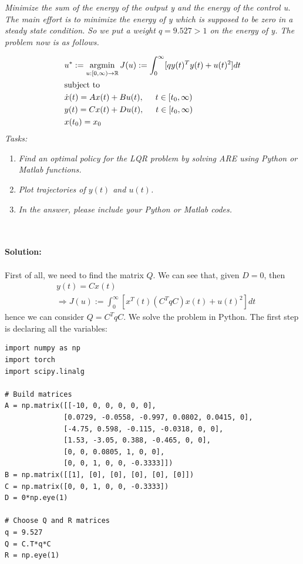 \emph{Minimize the sum of the energy of the output y and the energy of the control u. The main effort is to minimize the energy of y which is supposed to be zero in a steady state condition. So we put a weight $q = 9.527 > 1$ on the energy of y. The problem now is as follows.}

\begin{align}
    &u^* := \operatorname*{argmin}_{u:[0,\infty) \to \mathbb{R}} J(u) := \int_0^\infty [qy(t)^Ty(t) + u(t)^2] dt \\
    &\text{subject to}\\
    &\Dot{x}(t) = Ax(t) + Bu(t), \hspace{0.5cm} t \in [t_0, \infty) \\
    &y(t) = Cx(t) + Du(t), \hspace{0.5cm} t \in [t_0, \infty) \\
    &x(t_0) = x_0
\end{align}
\emph{Tasks:}

\begin{enumerate}
    \item \emph{Find an optimal policy for the LQR problem by solving ARE using Python or Matlab functions.}
    \item \emph{Plot trajectories of $y(t)$ and $u(t)$.}
    \item \emph{In the answer, please include your Python or Matlab codes.}
\end{enumerate}
\\
\\
\textbf{Solution:}\\
\\
First of all, we need to find the matrix $Q$. We can see that, given $D = 0$, then
\begin{align}
    &y(t) = Cx(t)\\
    &\Longrightarrow J(u) := \int_0^\infty [x^T(t)(C^T q C ) x(t) + u(t)^2] dt
\end{align}
hence we can consider $Q = C^T q C$.
We solve the problem in Python. The first step is declaring all the variables:

\begin{verbatim}
import numpy as np
import torch
import scipy.linalg

# Build matrices
A = np.matrix([[-10, 0, 0, 0, 0, 0],
              [0.0729, -0.0558, -0.997, 0.0802, 0.0415, 0],
              [-4.75, 0.598, -0.115, -0.0318, 0, 0],
              [1.53, -3.05, 0.388, -0.465, 0, 0],
              [0, 0, 0.0805, 1, 0, 0],
              [0, 0, 1, 0, 0, -0.3333]])
B = np.matrix([[1], [0], [0], [0], [0], [0]])
C = np.matrix([0, 0, 1, 0, 0, -0.3333])
D = 0*np.eye(1)

# Choose Q and R matrices
q = 9.527
Q = C.T*q*C
R = np.eye(1)
\end{verbatim}


